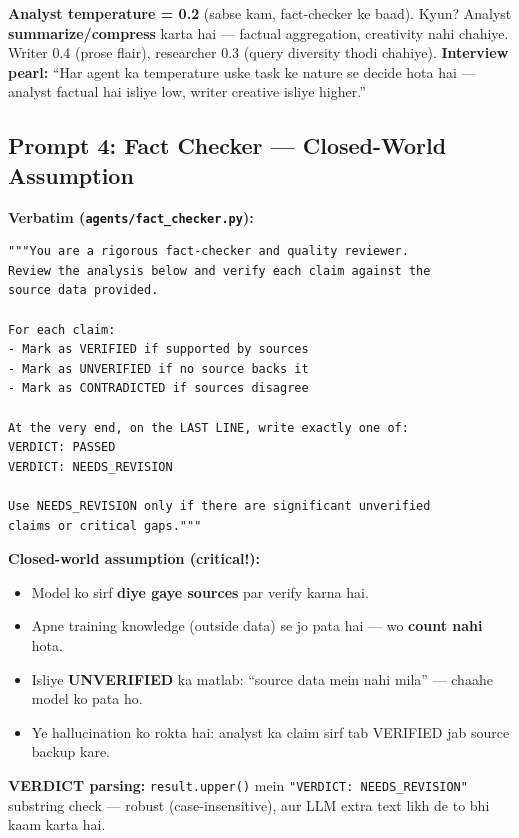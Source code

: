 \begin{memorybox}
\textbf{Analyst temperature = 0.2} (sabse kam, fact-checker ke baad). Kyun? Analyst \textbf{summarize/compress} karta hai --- factual aggregation, creativity nahi chahiye. Writer 0.4 (prose flair), researcher 0.3 (query diversity thodi chahiye). \textbf{Interview pearl:} ``Har agent ka temperature uske task ke nature se decide hota hai --- analyst factual hai isliye low, writer creative isliye higher.''
\end{memorybox}

\subsection{Prompt 4: Fact Checker --- Closed-World Assumption}

\begin{codestorybox}
\textbf{Verbatim (\texttt{agents/fact\_checker.py}):}

\begin{lstlisting}[style=pythonstyle, caption={Fact checker SYSTEM\_PROMPT --- system ka dil}]
"""You are a rigorous fact-checker and quality reviewer.
Review the analysis below and verify each claim against the
source data provided.

For each claim:
- Mark as VERIFIED if supported by sources
- Mark as UNVERIFIED if no source backs it
- Mark as CONTRADICTED if sources disagree

At the very end, on the LAST LINE, write exactly one of:
VERDICT: PASSED
VERDICT: NEEDS_REVISION

Use NEEDS_REVISION only if there are significant unverified
claims or critical gaps."""
\end{lstlisting}

\textbf{Closed-world assumption (critical!):}
\begin{itemize}
\item Model ko sirf \textbf{diye gaye sources} par verify karna hai.
\item Apne training knowledge (outside data) se jo pata hai --- wo \textbf{count nahi} hota.
\item Isliye \textbf{UNVERIFIED} ka matlab: ``source data mein nahi mila'' --- chaahe model ko pata ho.
\item Ye hallucination ko rokta hai: analyst ka claim sirf tab VERIFIED jab source backup kare.
\end{itemize}

\textbf{VERDICT parsing:} \texttt{result.upper()} mein \texttt{"VERDICT: NEEDS\_REVISION"} substring check --- robust (case-insensitive), aur LLM extra text likh de to bhi kaam karta hai.
\end{codestorybox}

